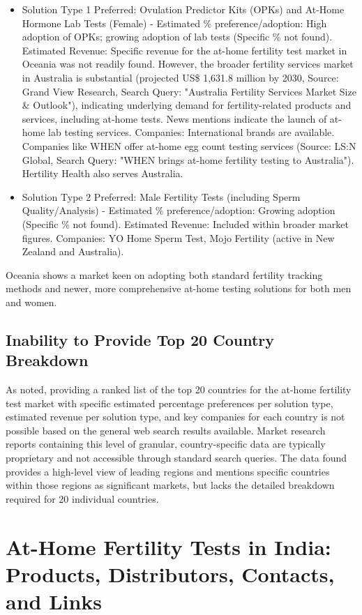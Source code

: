 \documentclass{article}
\begin{document}
\begin{itemize}
  \item Solution Type 1 Preferred: Ovulation Predictor Kits (OPKs) and At-Home Hormone Lab Tests (Female) - Estimated \% preference/adoption: High adoption of OPKs; growing adoption of lab tests (Specific \% not found).
    Estimated Revenue: Specific revenue for the at-home fertility test market in Oceania was not readily found. However, the broader fertility services market in Australia is substantial (projected US\$ 1,631.8 million by 2030, Source: Grand View Research, Search Query: "Australia Fertility Services Market Size \& Outlook"), indicating underlying demand for fertility-related products and services, including at-home tests. News mentions indicate the launch of at-home lab testing services.
    Companies: International brands are available. Companies like WHEN offer at-home egg count testing services (Source: LS:N Global, Search Query: "WHEN brings at-home fertility testing to Australia"). Hertility Health also serves Australia.
  \item Solution Type 2 Preferred: Male Fertility Tests (including Sperm Quality/Analysis) - Estimated \% preference/adoption: Growing adoption (Specific \% not found).
    Estimated Revenue: Included within broader market figures.
    Companies: YO Home Sperm Test, Mojo Fertility (active in New Zealand and Australia).
\end{itemize}
Oceania shows a market keen on adopting both standard fertility tracking methods and newer, more comprehensive at-home testing solutions for both men and women.

\subsection{Inability to Provide Top 20 Country Breakdown}
As noted, providing a ranked list of the top 20 countries for the at-home fertility test market with specific estimated percentage preferences per solution type, estimated revenue per solution type, and key companies for each country is not possible based on the general web search results available. Market research reports containing this level of granular, country-specific data are typically proprietary and not accessible through standard search queries. The data found provides a high-level view of leading regions and mentions specific countries within those regions as significant markets, but lacks the detailed breakdown required for 20 individual countries.

\section{At-Home Fertility Tests in India: Products, Distributors, Contacts, and Links}
\end{document}
